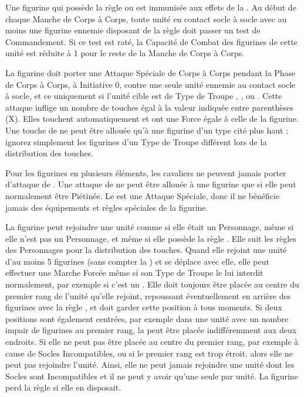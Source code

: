 
 Une figurine qui possède la règle \immunetopsychology{} ou \fear{} est immunisée aux effets de la \fear{}. Au début de chaque Manche de Corps à Corps, toute unité en contact socle à socle avec au moins une figurine ennemie disposant de la règle \fear{} doit passer un test de Commandement. Si ce test est raté, la Capacité de Combat des figurines de cette unité est réduite à 1 pour le reste de la Manche de Corps à Corps.


La figurine doit porter une Attaque Spéciale de Corps à Corps pendant la Phase de Corps à Corps, à Initiative 0, contre une seule unité ennemie au contact socle à socle, et ce uniquement si l'unité cible est de Type de Troupe \infantry{}, \warbeast{}, \swarm{} ou \newfromWHB{\warmachine}. Cette attaque inflige un nombre de touches égal à la valeur indiquée entre parenthèses (X). Elles touchent automatiquement et ont une Force égale à celle de la figurine. Une touche de \stomp{} ne peut être allouée qu'à une figurine d'un type cité plus haut ; ignorez simplement les figurines d'un Type de Troupe différent lors de la distribution des touches.

Pour les figurines en plusieurs éléments, les cavaliers ne peuvent jamais porter d'attaque de \stomp{}. Une attaque de \stomp{} ne peut être allouée à une figurine que si elle peut normalement être Piétinée. Le \stomp{} est une Attaque Spéciale, donc il ne bénéficie jamais des équipements et règles spéciales de la figurine.

\label{warplatform}

La figurine peut rejoindre une unité comme si elle était un Personnage, même si elle n'est pas un Personnage, et même si elle possède la règle \largetarget{}. Elle suit les règles des Personnages pour la distribution des touches. Quand elle rejoint une unité d'au moins 5 figurines (sans compter la \warplatform{}) et se déplace avec elle, elle peut effectuer une Marche Forcée même si son Type de Troupe le lui interdit normalement, par exemple si c'est un \chariot{}. Elle doit toujours être placée au centre du premier rang de l'unité qu'elle rejoint, repoussant éventuellement en arrière des figurines avec la règle \frontrank{}, et doit garder cette position à tous moments. Si deux positions sont également centrées, par exemple dans une unité avec un nombre impair de figurines au premier rang, la \warplatform{} peut être placée indifféremment aux deux endroits. Si elle ne peut pas être placée au centre du premier rang, par exemple à cause de Socles Incompatibles, ou si le premier rang est trop étroit, alors elle ne peut pas rejoindre l'unité. Ainsi, elle ne peut jamais rejoindre une unité dont les Socles sont Incompatibles et il ne peut y avoir qu'une seule \warplatform{} par unité. La figurine perd la règle \swiftstride{} si elle en disposait.

